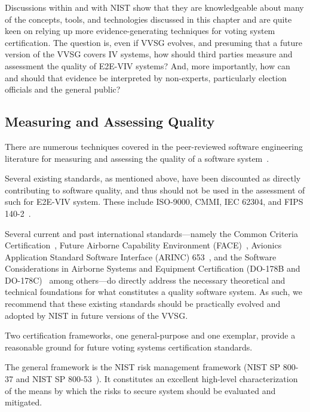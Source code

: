 Discussions within and with NIST show that they are knowledgeable about
many of the concepts, tools, and technologies discussed in this
chapter and are quite keen on relying up more evidence-generating
techniques for voting system certification.  The question is, even if
VVSG evolves, and presuming that a future version of the VVSG covers
IV systems, how should third parties measure and assessment the
quality of E2E-VIV systems?  And, more importantly, how can and should
that evidence be interpreted by non-experts, particularly election
officials and the general public?

\subsection{Measuring and Assessing Quality}

There are numerous techniques covered in the peer-reviewed software
engineering literature for measuring and assessing the quality of a
software
system~\cite{meyer2003grand,gao2002testing,briand2000exploring,nagappan2008influence,kan2002metrics}.

Several existing standards, as mentioned above, have been discounted
as directly contributing to software quality, and thus should not be
used in the assessment of such for E2E-VIV system.  These include
ISO-9000, CMMI, IEC 62304, and FIPS
140-2~\cite{ISO9000,herbsleb1997software,IEC-62304,FIPS-140-2}.

Several current and past international standards---namely the Common
Criteria Certification~\cite{ISO-IEC-15408}, Future Airborne Capability
Environment (FACE)~\cite{FACE}, Avionics Application Standard Software
Interface (ARINC) 653~\cite{ARINC653}, and the Software Considerations
in Airborne Systems and Equipment Certification (DO-178B and
DO-178C)~\cite{DO178B,DO178C} among others---do directly address the
necessary theoretical and technical foundations for what constitutes a
quality software system.  As such, we recommend that these existing
standards should be practically evolved and adopted by NIST in future
versions of the VVSG.

Two certification frameworks, one general-purpose and one exemplar,
provide a reasonable ground for future voting systems certification
standards.

The general framework is the NIST risk management framework (NIST SP
800-37 and NIST SP 800-53~\cite{NIST-800-37,NIST-800-53}).  It
constitutes an excellent high-level characterization of the means by
which the risks to secure system should be evaluated and mitigated.


